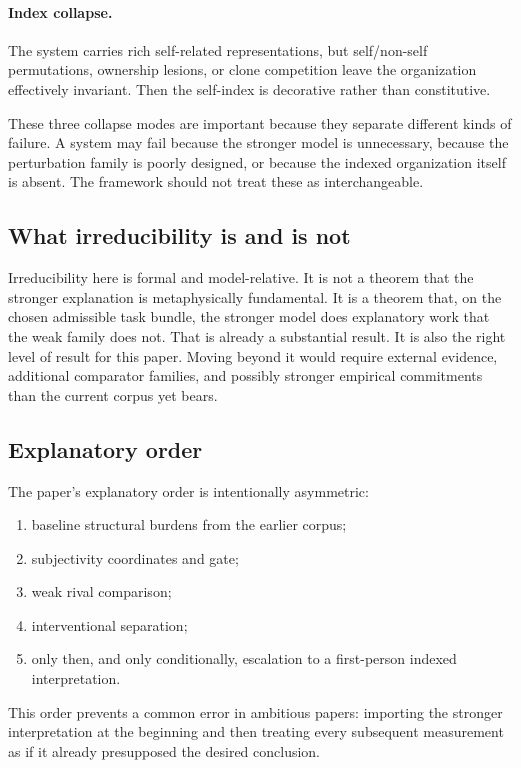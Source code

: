 \documentclass[11pt,a4paper]{article}
\theoremstyle{definition}
\begin{document}
\paragraph{Index collapse.} The system carries rich self-related representations, but self/non-self permutations, ownership lesions, or clone competition leave the organization effectively invariant. Then the self-index is decorative rather than constitutive.

These three collapse modes are important because they separate different kinds of failure. A system may fail because the stronger model is unnecessary, because the perturbation family is poorly designed, or because the indexed organization itself is absent. The framework should not treat these as interchangeable.

\subsection{What irreducibility is and is not}
Irreducibility here is formal and model-relative. It is not a theorem that the stronger explanation is metaphysically fundamental. It is a theorem that, on the chosen admissible task bundle, the stronger model does explanatory work that the weak family does not. That is already a substantial result. It is also the right level of result for this paper. Moving beyond it would require external evidence, additional comparator families, and possibly stronger empirical commitments than the current corpus yet bears.

\subsection{Explanatory order}
The paper's explanatory order is intentionally asymmetric:
\begin{enumerate}[leftmargin=1.5em]
\item baseline structural burdens from the earlier corpus;
\item subjectivity coordinates and gate;
\item weak rival comparison;
\item interventional separation;
\item only then, and only conditionally, escalation to a first-person indexed interpretation.
\end{enumerate}
This order prevents a common error in ambitious papers: importing the stronger interpretation at the beginning and then treating every subsequent measurement as if it already presupposed the desired conclusion.
\end{document}

